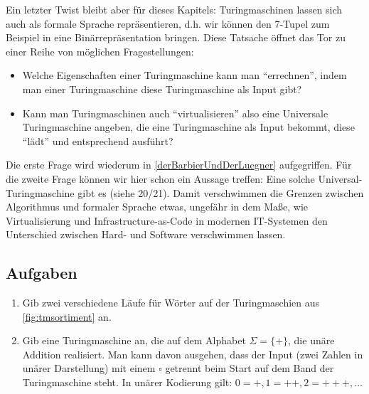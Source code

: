 Ein letzter Twist bleibt aber für dieses Kapitels:
Turingmaschinen lassen sich auch als formale Sprache repräsentieren,
d.h. wir können den 7-Tupel zum Beispiel in eine Binärrepräsentation bringen.
Diese Tatsache öffnet das Tor zu einer Reihe von möglichen Fragestellungen:
\begin{itemize}
    \item Welche Eigenschaften einer Turingmaschine kann man ``errechnen'',
        indem man einer Turingmaschine diese Turingmaschine als Input gibt?
    \item Kann man Turingmaschinen auch ``virtualisieren'' also eine Universale
        Turingmaschine angeben, die eine Turingmaschine als Input bekommt,
        diese ``lädt'' und entsprechend ausführt?
\end{itemize}
Die erste Frage wird wiederum in \autoref{derBarbierUndDerLuegner} aufgegriffen.
Für die zweite Frage können wir hier schon ein Aussage treffen:
Eine solche Universal-Turingmaschine gibt es (siehe \cite{CC} 20/21).
Damit verschwimmen die Grenzen zwischen Algorithmus und formaler Sprache etwas,
ungefähr in dem Maße,
wie Virtualisierung und Infrastructure-as-Code in modernen IT-Systemen
den Unterschied zwischen Hard- und Software verschwimmen lassen.

\subsection*{Aufgaben}

\begin{enumerate}
    \item Gib zwei verschiedene Läufe für Wörter auf der Turingmaschien aus
        \autoref{fig:tmsortiment} an.
    \item Gib eine Turingmaschine an, die auf dem Alphabet $\Sigma = \{+\}$,
        die unäre Addition realisiert.
        Man kann davon ausgehen, dass der Input (zwei Zahlen in unärer Darstellung)
        mit einem $\square$ getrennt beim Start auf dem Band der Turingmaschine steht.
        In unärer Kodierung gilt: $0 = +, 1 = ++, 2 = +++, \ldots$
\end{enumerate}
